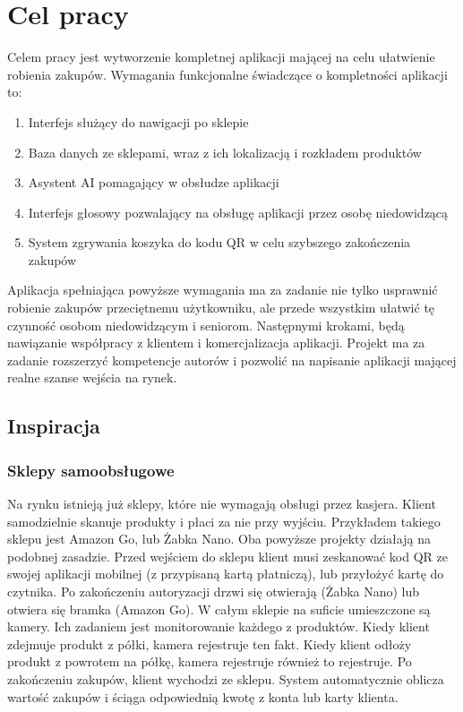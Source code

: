 \section{Cel pracy}

Celem pracy jest wytworzenie kompletnej aplikacji mającej na celu ułatwienie robienia zakupów. Wymagania funkcjonalne świadczące o kompletności aplikacji to:
\begin{enumerate}
    \item Interfejs służący do nawigacji po sklepie
    \item Baza danych ze sklepami, wraz z ich lokalizacją i rozkładem produktów
    \item Asystent AI pomagający w obsłudze aplikacji
    \item Interfejs głosowy pozwalający na obsługę aplikacji przez osobę niedowidzącą
    \item System zgrywania koszyka do kodu QR w celu szybszego zakończenia zakupów
\end{enumerate}
Aplikacja spełniająca powyższe wymagania ma za zadanie nie tylko usprawnić robienie zakupów przeciętnemu użytkowniku, ale przede wszystkim ułatwić tę czynność osobom niedowidzącym i seniorom. Następnymi krokami, będą nawiązanie współpracy z klientem i komercjalizacja aplikacji. Projekt ma za zadanie rozszerzyć kompetencje autorów i pozwolić na napisanie aplikacji mającej realne szanse wejścia na rynek. 



\subsection{Inspiracja}

\subsubsection{Sklepy samoobsługowe}
Na rynku istnieją już sklepy, które nie wymagają obsługi przez kasjera. Klient samodzielnie skanuje produkty i płaci za nie przy wyjściu. Przykładem takiego sklepu jest Amazon Go, lub Żabka Nano. Oba powyższe projekty działają na podobnej zasadzie.
Przed wejściem do sklepu klient musi zeskanować kod QR ze swojej aplikacji mobilnej (z przypisaną kartą płatniczą), lub przyłożyć kartę do czytnika. Po zakończeniu autoryzacji drzwi się otwierają (Żabka Nano) lub otwiera się bramka (Amazon Go). W całym sklepie na suficie umieszczone są kamery.
Ich zadaniem jest monitorowanie każdego z produktów. Kiedy klient zdejmuje produkt z półki, kamera rejestruje ten fakt. Kiedy klient odłoży produkt z powrotem na półkę, kamera rejestruje również to rejestruje. Po zakończeniu zakupów, klient wychodzi ze sklepu. System automatycznie oblicza wartość zakupów i ściąga odpowiednią kwotę z konta lub karty klienta.

